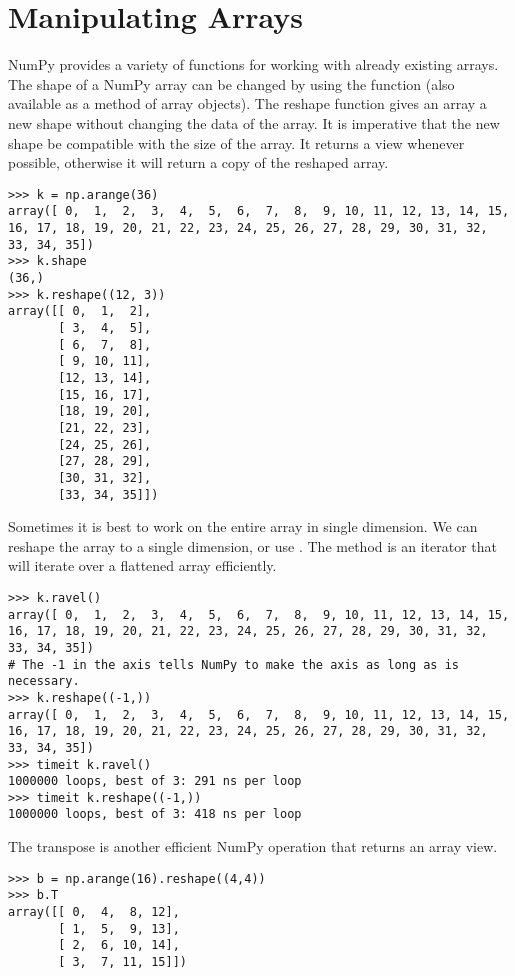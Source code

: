 \section*{Manipulating Arrays} NumPy provides a variety of functions for
working with already existing arrays. The shape of a NumPy array can be
changed by using the  function (also available as a
method of array objects). The reshape function gives an array a new
shape without changing the data of the array. It is imperative that 
the new shape be compatible with the size of the array. 
It returns a view whenever possible, otherwise it will return 
a copy of the reshaped array.
\begin{lstlisting}
>>> k = np.arange(36)
array([ 0,  1,  2,  3,  4,  5,  6,  7,  8,  9, 10, 11, 12, 13, 14, 15, 16, 17, 18, 19, 20, 21, 22, 23, 24, 25, 26, 27, 28, 29, 30, 31, 32, 33, 34, 35])
>>> k.shape
(36,)
>>> k.reshape((12, 3))
array([[ 0,  1,  2],
       [ 3,  4,  5],
       [ 6,  7,  8],
       [ 9, 10, 11],
       [12, 13, 14],
       [15, 16, 17],
       [18, 19, 20],
       [21, 22, 23],
       [24, 25, 26],
       [27, 28, 29],
       [30, 31, 32],
       [33, 34, 35]])
\end{lstlisting} 
Sometimes it is best to work on the entire array in single dimension. 
We can reshape the array to a single dimension, or use . 
The  method is an iterator that will iterate over a 
flattened array efficiently.
\begin{lstlisting}
>>> k.ravel()
array([ 0,  1,  2,  3,  4,  5,  6,  7,  8,  9, 10, 11, 12, 13, 14, 15, 16, 17, 18, 19, 20, 21, 22, 23, 24, 25, 26, 27, 28, 29, 30, 31, 32, 33, 34, 35])
# The -1 in the axis tells NumPy to make the axis as long as is necessary.
>>> k.reshape((-1,)) 
array([ 0,  1,  2,  3,  4,  5,  6,  7,  8,  9, 10, 11, 12, 13, 14, 15, 16, 17, 18, 19, 20, 21, 22, 23, 24, 25, 26, 27, 28, 29, 30, 31, 32, 33, 34, 35])
>>> timeit k.ravel()
1000000 loops, best of 3: 291 ns per loop
>>> timeit k.reshape((-1,))
1000000 loops, best of 3: 418 ns per loop 
\end{lstlisting} 
The transpose  is another efficient NumPy operation that returns an array
view. 

\begin{lstlisting}
>>> b = np.arange(16).reshape((4,4)) 
>>> b.T
array([[ 0,  4,  8, 12],
       [ 1,  5,  9, 13],
       [ 2,  6, 10, 14],
       [ 3,  7, 11, 15]])
\end{lstlisting}

